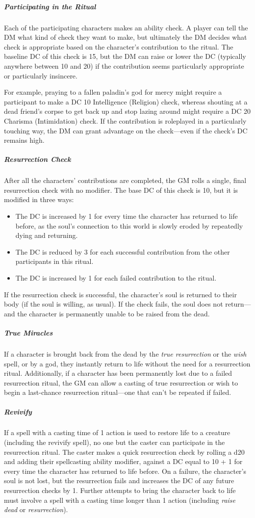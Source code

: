 \documentclass[a4paper,10pt,twoside,twocolumn,openany,bg=none,nodeprecatedcode]{dndarticle}
\begin{document}
\subparagraph{Participating in the Ritual} Each of the participating characters makes an ability check. A player can tell the DM what kind of check they want to make, but ultimately the DM decides what check is appropriate based on the character's contribution to the ritual. The baseline DC of this check is 15, but the DM can raise or lower the DC (typically anywhere between 10 and 20) if the contribution seems particularly appropriate or particularly insincere.

For example, praying to a fallen paladin's god for mercy might require a participant to make a DC 10 Intelligence (Religion) check, whereas shouting at a dead friend's corpse to get back up and stop lazing around might require a DC 20 Charisma (Intimidation) check. If the contribution is roleplayed in a particularly touching way, the DM can grant advantage on the check---even if the check's DC remains high.

\subparagraph{Resurrection Check} After all the characters' contributions are completed, the GM rolls a single, final resurrection check with no modifier. The base DC of this check is 10, but it is modified in three ways:
\begin{itemize}
\item The DC is increased by 1 for every time the character has returned to life before, as the soul's connection to this world is slowly eroded by repeatedly dying and returning.
\item The DC is reduced by 3 for each successful contribution from the other participants in this ritual.
\item The DC is increased by 1 for each failed contribution to the ritual.
\end{itemize}

If the resurrection check is successful, the character's soul is returned to their body (if the soul is willing, as usual). If the check fails, the soul does not return---and the character is permanently unable to be raised from the dead.

\subparagraph{True Miracles} If a character is brought back from the dead by the \emph{true resurrection} or the \emph{wish} spell, or by a god, they instantly return to life without the need for a resurrection ritual. Additionally, if a character has been permanently lost due to a failed resurrection ritual, the GM can allow a casting of true resurrection or wish to begin a last-chance resurrection ritual---one that can't be repeated if failed.

\subparagraph{Revivify} If a spell with a casting time of 1 action is used to restore life to a creature (including the revivify spell), no one but the caster can participate in the resurrection ritual. The caster makes a quick resurrection check by rolling a d20 and adding their spellcasting ability modifier, against a DC equal to 10 + 1 for every time the character has returned to life before. On a failure, the character's soul is not lost, but the resurrection fails and increases the DC of any future resurrection checks by 1. Further attempts to bring the character back to life must involve a spell with a casting time longer than 1 action (including \emph{raise dead} or \emph{resurrection}).
\end{document}
